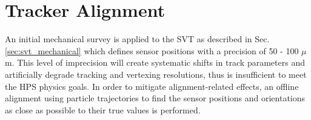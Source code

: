 


\clearpage

\section{Tracker Alignment}\label{sec:alignment}


An initial mechanical survey is applied to the SVT as described in Sec. \ref{sec:svt_mechanical} which defines sensor positions with a precision of 50 - 100 $\mu$m. This level of imprecision will create systematic shifts in track parameters and artificially degrade tracking and vertexing resolutions, thus is insufficient to meet the HPS physics goals. In order to mitigate alignment-related effects, an offline alignment using particle trajectories to find the sensor positions and orientations as close as possible to their true values is performed.

